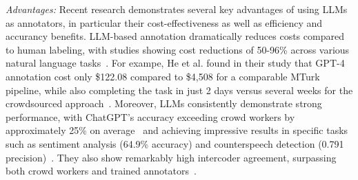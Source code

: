 \documentclass[11pt]{article}
\begin{document}
\emph{Advantages:} Recent research demonstrates several key advantages of using LLMs as annotators, in particular their cost-effectiveness as well as efficiency and accurancy benefits.
LLM-based annotation dramatically reduces costs compared to human labeling, with studies showing cost reductions of 50-96\% across various natural language tasks~\cite{DBLP:conf/emnlp/WangLXZZ21}.
For exampe, He et al. found in their study that GPT-4 annotation cost only \$122.08 compared to \$4,508 for a comparable MTurk pipeline, while also completing the task in just 2 days versus several weeks for the crowdsourced approach~\cite{DBLP:conf/chi/HeHDRH24}.
Moreover, LLMs consistently demonstrate strong performance, with ChatGPT's accuracy exceeding crowd workers by approximately 25\% on average~\cite{DBLP:journals/corr/abs-2303-15056} and achieving impressive results in specific tasks such as sentiment analysis (64.9\% accuracy) and counterspeech detection (0.791 precision)~\cite{DBLP:journals/corr/abs-2304-10145}. They also show remarkably high intercoder agreement, surpassing both crowd workers and trained annotators~\cite{DBLP:journals/corr/abs-2303-15056}.
\end{document}
